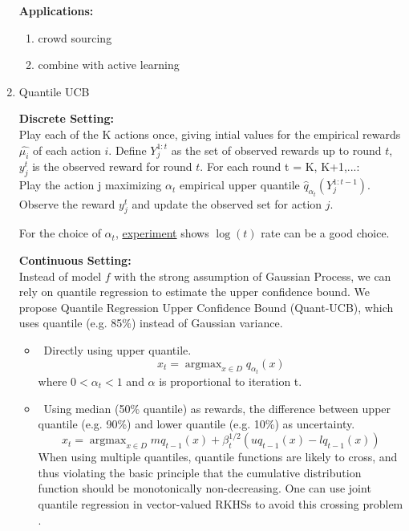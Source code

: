\documentclass[11pt]{article}
\DeclareMathOperator*{\argmax}{argmax}
\begin{document}
\begin{enumerate}
\textbf{Applications:}
\begin{enumerate}
    \item crowd sourcing
    \item combine with active learning
\end{enumerate}


\item Quantile UCB

\textbf{Discrete Setting:}\\
Play each of the K actions once, giving intial values for the empirical rewards $\hat{\mu_i}$ of each action $i$. Define $Y_j^{1:t}$ as the set of observed rewards up to round $t$, $y_j^{t}$ is the observed reward for round $t$. For each round t = K, K+1,...:\\

Play the action j maximizing $\alpha_t$ empirical upper quantile $\hat{q}_{\alpha_t}(Y_j^{1:t-1})$.\\
Observe the reward $y_j^t$ and update the observed set for action $j$.

For the choice of $\alpha_t$, \href{https://github.com/chengsoonong/eheye/blob/master/QuantUCB/Test for upper quantile idea.ipynb}{experiment} shows $\log(t)$ rate can be a good choice.

\textbf{Continuous Setting:}\\
Instead of model $f$ with the strong assumption of Gaussian Process, we can rely on quantile regression to estimate the upper confidence bound. We propose Quantile Regression Upper Confidence Bound (Quant-UCB), which uses quantile (e.g. 85\%) instead of Gaussian variance. \\
 
\begin{itemize}
\item \ Directly using upper quantile. 
    $$x_t = \argmax_{x \in D} q_{\alpha_t}(x)$$
    where $0 < \alpha_{t} < 1$ and $\alpha$ is proportional to iteration t.
\item \ Using median (50\% quantile) as rewards, the difference between upper quantile (e.g. 90\%) and lower quantile (e.g. 10\%) as uncertainty. 
$$x_t = \argmax_{x \in D} mq_{t-1} (x) + \beta_t^{1/2} (uq_{t-1} (x) - lq_{t-1}(x))$$
When using multiple quantiles, quantile functions are likely to cross, and thus violating the basic principle that the cumulative distribution function should be monotonically non-decreasing. One can use joint quantile regression in vector-valued RKHSs to avoid this crossing problem \cite{Sangnier:2016:JQR:3157382.3157511}. 


\end{itemize}
\end{enumerate}
\end{document}
